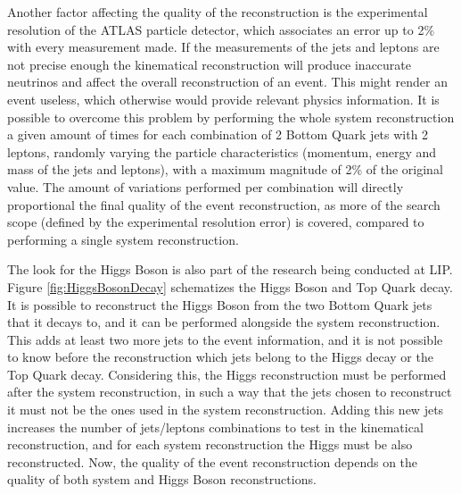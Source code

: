 Another factor affecting the quality of the reconstruction is the experimental resolution of the ATLAS particle detector, which associates an error up to 2\% with every measurement made. If the measurements of the jets and leptons are not precise enough the kinematical reconstruction will produce inaccurate neutrinos and affect the overall reconstruction of an event. This might render an event useless, which otherwise would provide relevant physics information. It is possible to overcome this problem by performing the whole \ttbar system reconstruction a given amount of times for each combination of 2 Bottom Quark jets with 2 leptons, randomly varying the particle characteristics (momentum, energy and mass of the jets and leptons), with a maximum magnitude of 2\% of the original value. The amount of variations performed per combination will directly proportional the final quality of the event reconstruction, as more of the search scope (defined by the experimental resolution error) is covered, compared to performing a single \ttbar system reconstruction.

The look for the Higgs Boson is also part of the research being conducted at LIP. Figure \ref{fig:HiggsBosonDecay} schematizes the Higgs Boson and Top Quark decay. It is possible to reconstruct the Higgs Boson from the two Bottom Quark jets that it decays to, and it can be performed alongside the \ttbar system reconstruction. This adds at least two more jets to the event information, and it is not possible to know before the reconstruction which jets belong to the Higgs decay or the Top Quark decay. Considering this, the Higgs reconstruction must be performed after the \ttbar system reconstruction, in such a way that the jets chosen to reconstruct it must not be the ones used in the \ttbar system reconstruction. Adding this new jets increases the number of jets/leptons combinations to test in the kinematical reconstruction, and for each \ttbar system reconstruction the Higgs must be also reconstructed. Now, the quality of the event reconstruction depends on the quality of both \ttbar system and Higgs Boson reconstructions.


